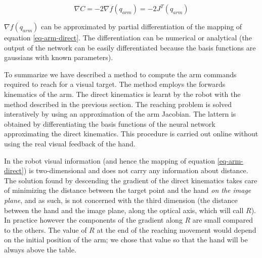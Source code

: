 \begin{equation}
  \nabla C=-2\nabla f\left(q_{arm}\right)=-2J^T\left(q_{arm}\right)
\label{eq-gradient}
\end{equation}

$\nabla f\left(q_{arm}\right)$ can be approximated by partial 
 differentiation of the mapping of equation \ref{eq-arm-direct}. The 
differentiation can be numerical or analytical (the output of the 
network can be easily differentiated because the basis functions are
gaussians with known parameters).

To summarize we have described a method to compute the arm commands
required to reach for a visual target. The method employs the 
forwards kinematics of the arm. The direct kinematics is learnt by the 
robot with the method described in the previous section. The reaching 
problem is solved interatively by using an approximation of the arm
Jacobian. The lattern is obtained by differentiating the basis functions 
of the neural network approximating the direct kinematics. This procedure
is carried out online without using the real visual feedback of the hand.

In the robot visual information (and hence the mapping of equation 
\ref{eq-arm-direct}) is two-dimensional and does not carry any information
about distance. The solution found by descending the gradient of the 
direct kinematics takes care of minimizing the distance between the target 
point and the hand \emph{on the image plane}, and as such, is not concerned 
with the third dimension (the distance between the hand and the image 
plane, along the optical axis, which will call $R$). 
In practice however the components of the gradient along $R$ are small 
compared to the others. The value of $R$ at the end of the reaching movement 
would depend on the initial position of the arm; we chose that value so that
the hand will be always above the table.

